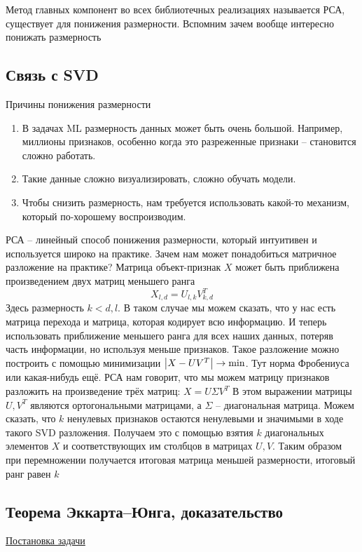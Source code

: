 Метод главных компонент во всех библиотечных реализациях называется РСА, существует для понижения размерности.
Вспомним зачем вообще интересно понижать размерность

\subsection{Связь с SVD}
Причины понижения размерности
\begin{enumerate}
    \item В задачах ML размерность данных может быть очень большой.
    Например, миллионы признаков, особенно когда это разреженные признаки -- становится сложно работать.
    \item Такие данные сложно визуализировать, сложно обучать модели.
    \item Чтобы снизить размерность, нам требуется использовать какой-то механизм, который по-хорошему воспроизводим.
\end{enumerate}
РСА -- линейный способ понижения размерности, который интуитивен и используется широко на практике.
Зачем нам может понадобиться матричное разложение на практике?
Матрица объект-признак $X$ может быть приближена произведением двух матриц меньшего ранга
\[ X_{l,d} = U_{l, k} V_{k, d}^T \]
Здесь размерность $k < d, l$.
В таком случае мы можем сказать, что у нас есть матрица перехода и матрица, которая кодирует всю информацию.
И теперь использовать приближение меньшего ранга для всех наших данных, потеряв часть информации, но используя
меньше признаков.
Такое разложение можно построить с помощью минимизации $\abs{X - U V^T} \rightarrow \min$.
Тут норма Фробениуса или какая-нибудь ещё.
РСА нам говорит, что мы можем матрицу признаков разложить на произведение трёх матриц: $X = U \Sigma V^T$
В этом выражении матрицы $U, V^T$ являются ортогональными матрицами, а $\Sigma $ -- диагональная матрица.
Можем сказать, что $k$ ненулевых признаков остаются ненулевыми и значимыми в ходе такого SVD разложения.
Получаем это с помощью взятия $k$ диагональных элементов $X$ и соответствующих им столбцов в матрицах $U, V$.
Таким образом при перемножении получается итоговая матрица меньшей размерности, итоговый ранг равен $k$

\subsection{Теорема Эккарта–Юнга, доказательство}

\underline{Постановка задачи}

